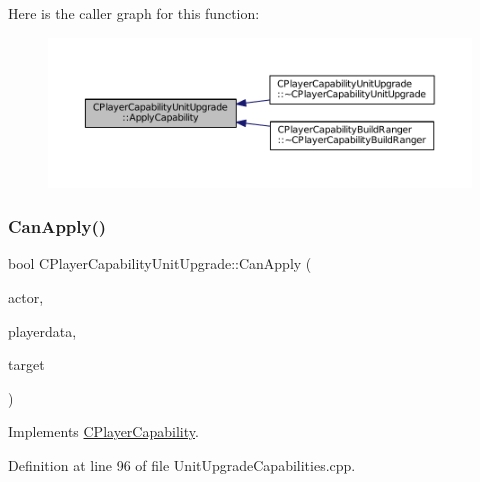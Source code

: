 Here is the caller graph for this function\+:
\nopagebreak
\begin{figure}[H]
\begin{center}
\leavevmode
\includegraphics[width=350pt]{classCPlayerCapabilityUnitUpgrade_a8cc6fee17dd178fd798e36c3d5301e9d_icgraph}
\end{center}
\end{figure}
\hypertarget{classCPlayerCapabilityUnitUpgrade_a93d1a57f2cc52b90ce6cb714717bfefd}{}\label{classCPlayerCapabilityUnitUpgrade_a93d1a57f2cc52b90ce6cb714717bfefd} 
\subsubsection{\texorpdfstring{Can\+Apply()}{CanApply()}}
{\footnotesize\ttfamily bool C\+Player\+Capability\+Unit\+Upgrade\+::\+Can\+Apply (\begin{DoxyParamCaption}\item[{std\+::shared\+\_\+ptr$<$ \hyperlink{classCPlayerAsset}{C\+Player\+Asset} $>$}]{actor,  }\item[{std\+::shared\+\_\+ptr$<$ \hyperlink{classCPlayerData}{C\+Player\+Data} $>$}]{playerdata,  }\item[{std\+::shared\+\_\+ptr$<$ \hyperlink{classCPlayerAsset}{C\+Player\+Asset} $>$}]{target }\end{DoxyParamCaption})\hspace{0.3cm}{\ttfamily [virtual]}}



Implements \hyperlink{classCPlayerCapability_ae96263e0950f496492f8baeb877b9554}{C\+Player\+Capability}.



Definition at line 96 of file Unit\+Upgrade\+Capabilities.\+cpp.


